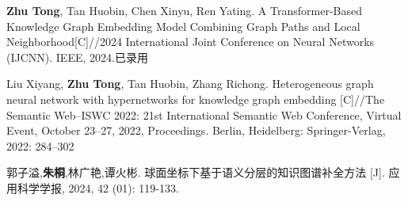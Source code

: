 \achievement

\noindent
[1] \textbf{Zhu Tong}, Tan Huobin, Chen Xinyu, Ren Yating. A Transformer-Based Knowledge Graph Embedding Model Combining Graph Paths and Local Neighborhood[C]//2024 International Joint Conference on Neural Networks (IJCNN). IEEE, 2024.已录用

\noindent
[2] Liu Xiyang, \textbf{Zhu Tong}, Tan Huobin, Zhang Richong. Heterogeneous graph neural network with hypernetworks
for knowledge graph embedding [C]//The Semantic Web–ISWC 2022: 21st International
Semantic Web Conference, Virtual Event, October 23–27, 2022, Proceedings. Berlin,
Heidelberg: Springer-Verlag, 2022: 284–302

\noindent
[3] 郭子溢,\textbf{朱桐},林广艳,谭火彬. 球面坐标下基于语义分层的知识图谱补全方法 [J]. 应用科学学报, 2024, 42 (01): 119-133.


